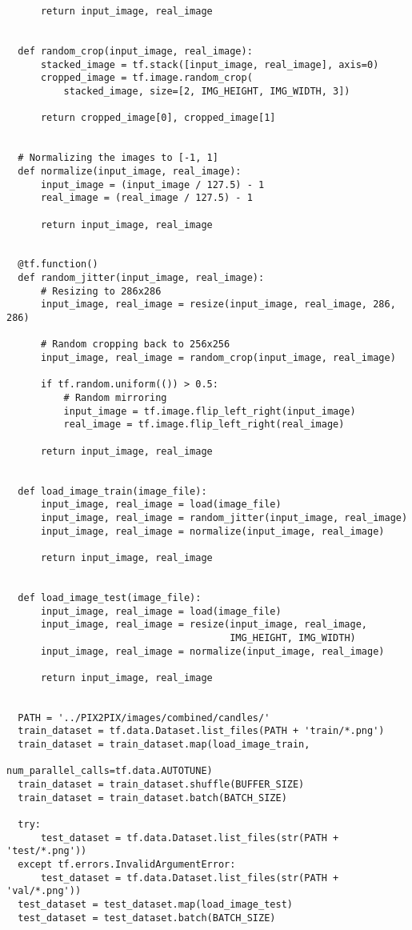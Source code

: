 \begin{lstlisting}
      return input_image, real_image


  def random_crop(input_image, real_image):
      stacked_image = tf.stack([input_image, real_image], axis=0)
      cropped_image = tf.image.random_crop(
          stacked_image, size=[2, IMG_HEIGHT, IMG_WIDTH, 3])

      return cropped_image[0], cropped_image[1]


  # Normalizing the images to [-1, 1]
  def normalize(input_image, real_image):
      input_image = (input_image / 127.5) - 1
      real_image = (real_image / 127.5) - 1

      return input_image, real_image


  @tf.function()
  def random_jitter(input_image, real_image):
      # Resizing to 286x286
      input_image, real_image = resize(input_image, real_image, 286, 286)

      # Random cropping back to 256x256
      input_image, real_image = random_crop(input_image, real_image)

      if tf.random.uniform(()) > 0.5:
          # Random mirroring
          input_image = tf.image.flip_left_right(input_image)
          real_image = tf.image.flip_left_right(real_image)

      return input_image, real_image


  def load_image_train(image_file):
      input_image, real_image = load(image_file)
      input_image, real_image = random_jitter(input_image, real_image)
      input_image, real_image = normalize(input_image, real_image)

      return input_image, real_image


  def load_image_test(image_file):
      input_image, real_image = load(image_file)
      input_image, real_image = resize(input_image, real_image,
                                       IMG_HEIGHT, IMG_WIDTH)
      input_image, real_image = normalize(input_image, real_image)

      return input_image, real_image


  PATH = '../PIX2PIX/images/combined/candles/'
  train_dataset = tf.data.Dataset.list_files(PATH + 'train/*.png')
  train_dataset = train_dataset.map(load_image_train,
                                    num_parallel_calls=tf.data.AUTOTUNE)
  train_dataset = train_dataset.shuffle(BUFFER_SIZE)
  train_dataset = train_dataset.batch(BATCH_SIZE)

  try:
      test_dataset = tf.data.Dataset.list_files(str(PATH + 'test/*.png'))
  except tf.errors.InvalidArgumentError:
      test_dataset = tf.data.Dataset.list_files(str(PATH + 'val/*.png'))
  test_dataset = test_dataset.map(load_image_test)
  test_dataset = test_dataset.batch(BATCH_SIZE)


\end{lstlisting}
